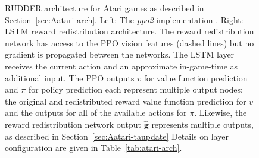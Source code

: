 \documentclass{article}
\newcommand{\figpath}{figures/}
\newcommand{\returnrealization}{\mathbf{g}}
\begin{document}
\begin{appendices}
\begin{figure}[htp]\centering \resizebox{0.5\textwidth}{0.5\textwidth}{}\caption{RUDDER architecture for Atari games as described in Section~\ref{sec:Aatari-arch}. 
 Left: The {\em ppo2} implementation \cite{Dhariwal:17}.
 Right: LSTM reward redistribution architecture.
 The reward redistribution network has access to the PPO vision features (dashed lines)
 but no gradient is propagated between the networks.
 The LSTM layer receives the current action and an approximate 
 in-game-time as additional input.
 The PPO outputs $v$ for value function prediction and $\pi$ for policy prediction each represent multiple output nodes: the original and redistributed reward value function prediction for $v$ and the outputs for all of the available actions for $\pi$.
 Likewise, the reward redistribution network output $\widehat{\returnrealization}$ represents multiple outputs, 
 as described in Section~\ref{sec:Aatari-taupdate}
 Details on layer configuration are given in Table~\ref{tab:atari-arch}.\label{fig:atari-arch}}\end{figure}


\end{appendices}
\end{document}
